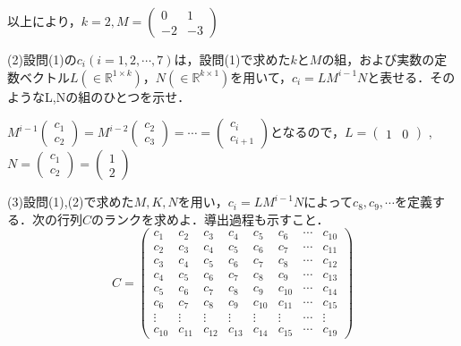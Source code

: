 \documentclass[a4j]{jarticle}
\let \ds \displaystyle
\begin{document}
以上により，$\ds k=2, M=\begin{pmatrix}0 & 1 \\ -2 & -3\end{pmatrix}$

\begin{screen}
 (2)設問(1)の$c_i(i=1,2,\cdots,7)$は，設問(1)で求めた$k$と$M$の組，および実数の定数ベクトル$L(\in \mathbb{R}^{1\times k})$，$N(\in\mathbb{R}^{k \times 1})$を用いて，$c_i=LM^{i-1}N$と表せる．そのようなL,Nの組のひとつを示せ．
\end{screen}

$\ds M^{i-1}\begin{pmatrix}c_1 \\ c_2\end{pmatrix} = M^{i-2}\begin{pmatrix}c_2 \\ c_3\end{pmatrix} = \cdots = \begin{pmatrix}c_i \\ c_{i+1}\end{pmatrix}$となるので，$\ds L=\begin{pmatrix}1 & 0\end{pmatrix}$ , $N=\begin{pmatrix}c_1 \\ c_2\end{pmatrix} = \begin{pmatrix}1 \\ 2\end{pmatrix}$

\begin{screen}
 (3)設問(1),(2)で求めた$M,K,N$を用い，$c_i=LM^{i-1}N$によって$c_8,c_9,\cdots$を定義する．次の行列$C$のランクを求めよ．導出過程も示すこと．
 $$C=
 \begin{pmatrix}
  c_1 & c_2 & c_3 & c_4 & c_5 & c_6 & \cdots & c_{10} \\
  c_2 & c_3 & c_4 & c_5 & c_6 & c_7 & \cdots & c_{11} \\
  c_3 & c_4 & c_5 & c_6 & c_7 & c_8 & \cdots & c_{12} \\
  c_4 & c_5 & c_6 & c_7 & c_8 & c_9 & \cdots & c_{13} \\
  c_5 & c_6 & c_7 & c_8 & c_9 & c_{10} & \cdots & c_{14} \\
  c_6 & c_7 & c_8 & c_9 & c_{10} & c_{11} & \cdots & c_{15} \\
  \vdots & \vdots & \vdots & \vdots & \vdots & \vdots & \cdots & \vdots \\
  c_{10} & c_{11} & c_{12} & c_{13} & c_{14} & c_{15} & \cdots & c_{19}
 \end{pmatrix}$$
\end{screen}
\end{document}
